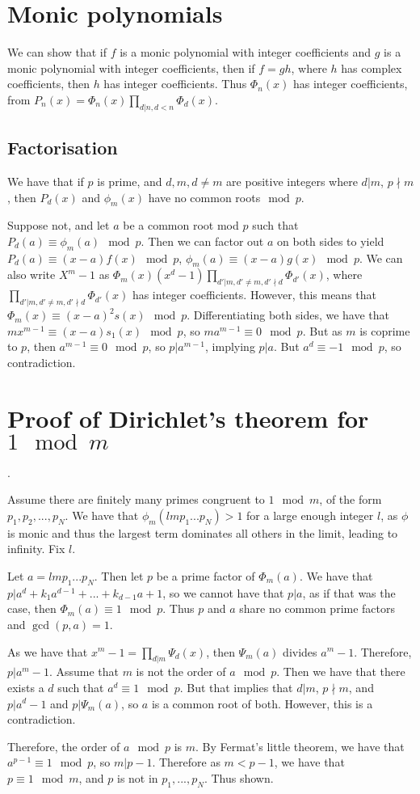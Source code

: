 \documentclass[]{article}
\begin{document}
\section{Monic polynomials}
We can show that if $f$ is a monic polynomial with integer coefficients and $g$ is a monic polynomial with integer coefficients, then if $f = gh$, where $h$ has complex coefficients, then $h$ has integer coefficients. Thus $\Phi_n(x)$ has integer coefficients, from $P_n(x) = \Phi_n(x) \prod_{d | n, d < n} \Phi_d(x)$. 

\subsection{Factorisation}
We have that if $p$ is prime, and $d, m, d \neq m$ are positive integers where $d | m$, $p \nmid m$, then $P_d(x)$ and $\phi_m(x)$ have no common roots$\mod p$. 

Suppose not, and let $a$ be a common root mod $p$ such that $P_d(a) \equiv \phi_m(a) \mod p$.  Then we can factor out $a$ on both sides to yield $P_d(a) \equiv (x - a)f(x) \mod p$, $\phi_m(a) \equiv (x - a) g(x) \mod p$. We can also write $X^m - 1$ as $\Phi_m(x) (x^d - 1) \prod_{d' | m, d'\neq m, d' \nmid d} \Phi_{d'}(x)$, where $\prod_{d' | m, d'\neq m, d' \nmid d} \Phi_{d'}(x)$ has integer coefficients. 
However, this means that $\Phi_m(x) \equiv (x - a)^2 s(x) \mod p$. Differentiating both sides, we have that $mx^{m-1} \equiv (x-a) s_1(x) \mod p$, so $ma^{m-1} \equiv 0 \mod p$. But as $m$ is coprime to $p$, then $a^{m-1} \equiv 0 \mod p$, so $p|a^{m-1}$, implying $p|a$. But $a^d \equiv -1 \mod p$, so contradiction. 

\section{Proof of Dirichlet's theorem for $1 \mod m$}.

Assume there are finitely many primes congruent to $1 \mod m$, of the form $p_1, p_2, ..., p_N$.
We have that $\phi_m(lmp_1 ... p_N)> 1$ for a large enough integer $l$, as $\phi$ is monic and thus the largest term dominates all others in the limit, leading to infinity. Fix $l$.

Let $a = lmp_1 ... p_N$. 
Then let $p$ be a prime factor of $\Phi_m(a)$. We have that $p | a^d + k_1 a^{d-1} + ... + k_{d-1} a + 1$, so we cannot have that $p | a$, as if that was the case, then $\Phi_m(a) \equiv 1 \mod p$. Thus $p$ and $a$ share no common prime factors and $\gcd(p,a) = 1$.

As we have that $x^m - 1 = \prod_{d | m} \Psi_d(x)$, then $\Psi_m(a)$ divides $a^m - 1$. Therefore, $p | a^m - 1$. Assume that $m$ is not the order of $a \mod p$. Then we have that there exists a $d$ such that $a^d \equiv 1 \mod p$. But that implies that $d | m$, $p \nmid m$, and $p | a^d - 1$ and $p| \Psi_m(a)$, so $a$ is a common root of both. However, this is a contradiction.

Therefore, the order of $a \mod p$ is $m$. By Fermat's little theorem, we have that $a^{p-1} \equiv 1 \mod p$, so $m | p-1$. Therefore as $m < p -1$, we have that $p \equiv 1 \mod m$, and $p$ is not in $p_1, ..., p_N$. Thus shown. 
\end{document}
